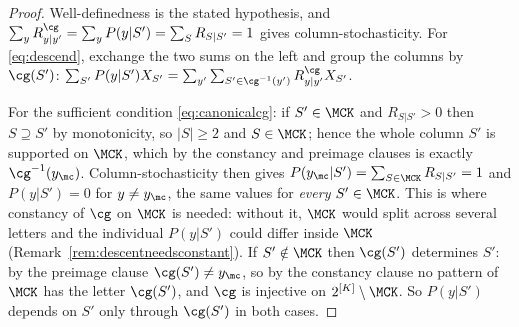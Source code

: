 \begin{proof}
Well-definedness is the stated hypothesis, and
$\sum_yR^{\cg}_{y|y'}=\sum_yP(y|S')=\sum_SR_{S|S'}=1$ gives
column-stochasticity. For \eqref{eq:descend}, exchange the two sums on the left
and group the columns by $\cg(S')$:
$\sum_{S'}P(y|S')X_{S'}
=\sum_{y'}\sum_{S'\in\cg^{-1}(y')}R^{\cg}_{y|y'}X_{S'}$.

For the sufficient condition \eqref{eq:canonicalcg}: if $S'\in\MCK$ and
$R_{S|S'}>0$ then $S\supseteq S'$ by monotonicity, so $|S|\ge2$ and $S\in\MCK$;
hence the whole column $S'$ is supported on $\MCK$, which by the constancy and
preimage clauses is exactly $\cg^{-1}(y_{\mc})$. Column-stochasticity then gives
$P(y_{\mc}|S')=\sum_{S\in\MCK}R_{S|S'}=1$ and $P(y|S')=0$ for $y\ne y_{\mc}$,
the same values for \emph{every} $S'\in\MCK$. This is where constancy of
$\cg$ on $\MCK$ is needed: without it, $\MCK$ would split across several
letters and the individual $P(y|S')$ could differ inside $\MCK$
(Remark~\ref{rem:descentneedsconstant}). If $S'\notin\MCK$ then $\cg(S')$
determines $S'$: by the preimage clause $\cg(S')\ne y_{\mc}$, so by the
constancy clause no pattern of $\MCK$ has the letter $\cg(S')$, and $\cg$ is
injective on $2^{[K]}\setminus\MCK$. So $P(y|S')$ depends on $S'$
only through $\cg(S')$ in both cases.
\end{proof}
